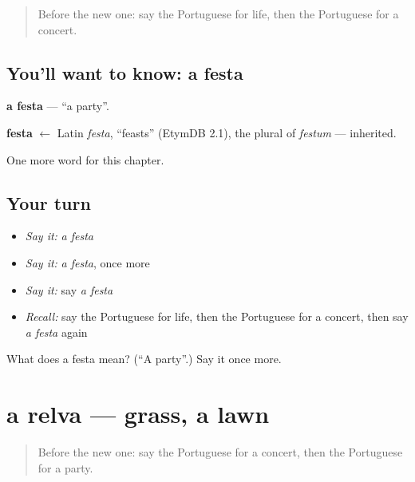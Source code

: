 \label{lesson:PT-C115-festa}



\begin{quote}
Before the new one: say the Portuguese for life, then the Portuguese for a concert.
\end{quote}

\subsection*{You'll want to know: a festa}
\textbf{a festa} — \textquotedblleft{}a party\textquotedblright{}.

\begin{cousinweb}
\textbf{festa} $\leftarrow$ Latin \emph{festa}, \textquotedblleft{}feasts\textquotedblright{} (EtymDB 2.1), the plural of \emph{festum} — inherited.
\end{cousinweb}

\begin{grammarlens}[title={What you've built}]
One more word for this chapter.
\end{grammarlens}

\subsection*{Your turn}
\begin{itemize}
\raggedright
  \item \emph{Say it:} \emph{a festa}
  \item \emph{Say it:} \emph{a festa}, once more
  \item \emph{Say it:} say \emph{a festa}
  \item \emph{Recall:} say the Portuguese for life, then the Portuguese for a concert, then say \emph{a festa} again
\end{itemize}

\begin{tcolorbox}[breakable,colback=teal!4,colframe=teal!35!black,title={Before you move on}]
What does a festa mean? (\textquotedblleft{}A party\textquotedblright{}.) Say it once more.
\end{tcolorbox}
\section[a relva]{a relva — grass, a lawn}

\label{lesson:PT-C115-relva}



\begin{quote}
Before the new one: say the Portuguese for a concert, then the Portuguese for a party.
\end{quote}

